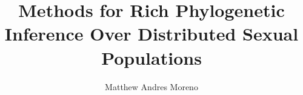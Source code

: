 \title{Methods for Rich Phylogenetic Inference Over Distributed Sexual Populations}

\author{Matthew Andres Moreno}
%
%
\maketitle
